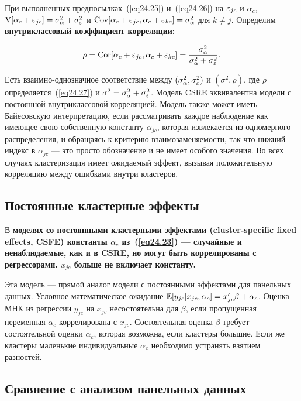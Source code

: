 При выполненных предпосылках~(\ref{eq24.25}) и~(\ref{eq24.26}) на $\varepsilon_{jc}$ и $\alpha_c$, $\mathrm{V}[\alpha_c + \varepsilon_{jc}] = \sigma^2_{\alpha} + \sigma^2_{\varepsilon}$ и $\mathrm{Cov}[\alpha_c + \varepsilon_{jc}, \alpha_c + \varepsilon_{kc}] = \sigma^2_{\alpha}$ для $k \ne j$. Определим \bfseries внутриклассовый коэффициент корреляции: \mdseries

\begin{equation}
\label{eq24.27}
\rho = \mathrm{Cor}[\alpha_c + \varepsilon_{jc}, \alpha_c + \varepsilon_{kc}] = \frac{\sigma^2_{\alpha}}{\sigma^2_{\alpha}+\sigma^2_{\varepsilon}}.
\end{equation}

Есть взаимно-однозначное соответствие между $(\sigma^2_{\alpha}, \sigma^2_{\varepsilon})$ и $(\sigma^2, \rho)$, где $\rho$ определяется~(\ref{eq24.27}) и $\sigma^2 = \sigma^2_{\alpha} + \sigma^2_{\varepsilon}$. Модель CSRE эквивалентна модели с постоянной внутриклассовой корреляцией. Модель также может иметь Байесовскую интерпретацию, если рассматривать каждое наблюдение как имеющее свою собственную константу $\alpha_{jc}$, которая извлекается из одномерного распределения, и обращаясь к критерию взаимозаменяемости, так что нижний индекс в $\alpha_{jc}$ --- это просто обозначение и не имеет особого значения. Во всех случаях кластеризация имеет ожидаемый эффект, вызывая положительную корреляцию между ошибками внутри кластеров. 

\subsection*{Постоянные кластерные эффекты}

В \bfseries моделях со постоянными кластерными эффектами \mdseries (cluster-specific fixed effects, CSFE) константы $\alpha_c$ из~(\ref{eq24.23}) --- случайные и ненаблюдаемые, как и в CSRE, но могут быть коррелированы с регрессорами. $x_{jc}$ больше не включает константу. 

Эта модель --- прямой аналог модели с постоянными эффектами для панельных данных. Условное математическое ожидание $\mathbb{E}[y_{jc}|x_{jc},\alpha_c] = x'_{jc} \beta + \alpha_c$. Оценка МНК из регрессии $y_{jc}$ на $x_{jc}$ несостоятельна для $\beta$, если пропущенная переменная $\alpha_c$ коррелирована с $x_{jc}$. Состоятельная оценка $\beta$ требует состоятельной оценки $\alpha_c$, которая возможна, если кластеры большие. Если же кластеры маленькие индивидуальные $\alpha_c$ необходимо устранять взятием разностей. 

\subsection*{Сравнение с анализом панельных данных}

